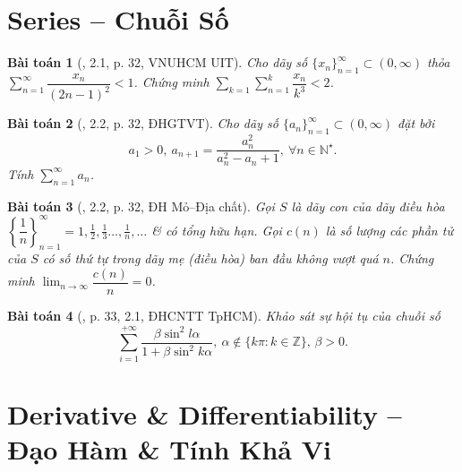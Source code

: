 \documentclass{article}
\newtheorem{baitoan}{Bài toán}
\begin{document}

\section{Series -- Chuỗi Số}

\begin{baitoan}[\cite{VMS_VMC2023}, 2.1, p. 32, VNUHCM UIT]
	Cho dãy số $\{x_n\}_{n=1}^\infty\subset(0,\infty)$ thỏa $\sum_{n=1}^\infty \dfrac{x_n}{(2n - 1)^2} < 1$. Chứng minh $\sum_{k=1}\sum_{n=1}^k \dfrac{x_n}{k^3} < 2$.
\end{baitoan}

\begin{baitoan}[\cite{VMS_VMC2023}, 2.2, p. 32, ĐHGTVT]
	Cho dãy số $\{a_n\}_{n=1}^\infty\subset(0,\infty)$ đặt bởi
	\begin{equation*}
		a_1 > 0,\ a_{n+1} = \frac{a_n^2}{a_n^2 - a_n + 1},\ \forall n\in\mathbb{N}^\star.
	\end{equation*}
	Tính $\sum_{n=1}^\infty a_n$.
\end{baitoan}

\begin{baitoan}[\cite{VMS_VMC2023}, 2.2, p. 32, ĐH Mỏ--Địa chất]
	Gọi $S$ là dãy con của dãy điều hòa $\left\{\dfrac{1}{n}\right\}_{n=1}^\infty = 1,\frac{1}{2},\frac{1}{3}\ldots,\frac{1}{n},\ldots$ \& có tổng hữu hạn. Gọi $c(n)$ là số lượng các phần tử của $S$ có số thứ tự trong dãy mẹ (điều hòa) ban đầu không vượt quá $n$. Chứng minh $\lim_{n\to\infty} \dfrac{c(n)}{n} = 0$.
\end{baitoan}

\begin{baitoan}[\cite{VMS_VMC2024}, p. 33, 2.1, ĐHCNTT TpHCM]
	Khảo sát sự hội tụ của chuỗi số
	\begin{equation*}
		\sum_{i=1}^{+\infty} \frac{\beta\sin^2l\alpha}{1 + \beta\sin^2k\alpha},\ \alpha\notin\{k\pi:k\in\mathbb{Z}\},\,\beta > 0.
	\end{equation*}
\end{baitoan}


\section{Derivative \& Differentiability -- Đạo Hàm \& Tính Khả Vi}

\end{document}
